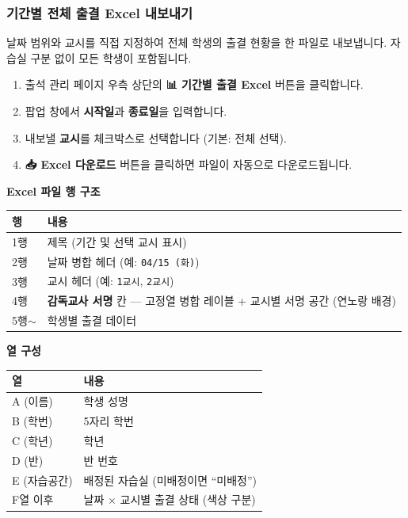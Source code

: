 \documentclass[a4paper,12pt]{article}
\newcommand{\menu}[1]{\textcolor{primary}{\textbf{#1}}}
\begin{document}
\subsubsection{기간별 전체 출결 Excel 내보내기}

날짜 범위와 교시를 직접 지정하여 전체 학생의 출결 현황을 한 파일로 내보냅니다.
자습실 구분 없이 모든 학생이 포함됩니다.

\begin{enumerate}[leftmargin=1.5em]
    \item 출석 관리 페이지 우측 상단의 \menu{📊 기간별 출결 Excel} 버튼을 클릭합니다.
    \item 팝업 창에서 \textbf{시작일}과 \textbf{종료일}을 입력합니다.
    \item 내보낼 \textbf{교시}를 체크박스로 선택합니다 (기본: 전체 선택).
    \item \menu{📥 Excel 다운로드} 버튼을 클릭하면 파일이 자동으로 다운로드됩니다.
\end{enumerate}

\textbf{Excel 파일 행 구조}

\begin{center}
\begin{tabular}{ll}
\toprule
\textbf{행} & \textbf{내용} \\
\midrule
1행 & 제목 (기간 및 선택 교시 표시) \\
2행 & 날짜 병합 헤더 (예: \texttt{04/15 (화)}) \\
3행 & 교시 헤더 (예: \texttt{1교시}, \texttt{2교시}) \\
4행 & \textbf{감독교사 서명} 칸 --- 고정열 병합 레이블 + 교시별 서명 공간 (연노랑 배경) \\
5행$\sim$ & 학생별 출결 데이터 \\
\bottomrule
\end{tabular}
\end{center}

\textbf{열 구성}

\begin{center}
\begin{tabular}{ll}
\toprule
\textbf{열} & \textbf{내용} \\
\midrule
A (이름) & 학생 성명 \\
B (학번) & 5자리 학번 \\
C (학년) & 학년 \\
D (반) & 반 번호 \\
E (자습공간) & 배정된 자습실 (미배정이면 ``미배정'') \\
F열 이후 & 날짜 × 교시별 출결 상태 (색상 구분) \\
\bottomrule
\end{tabular}
\end{center}
\end{document}
